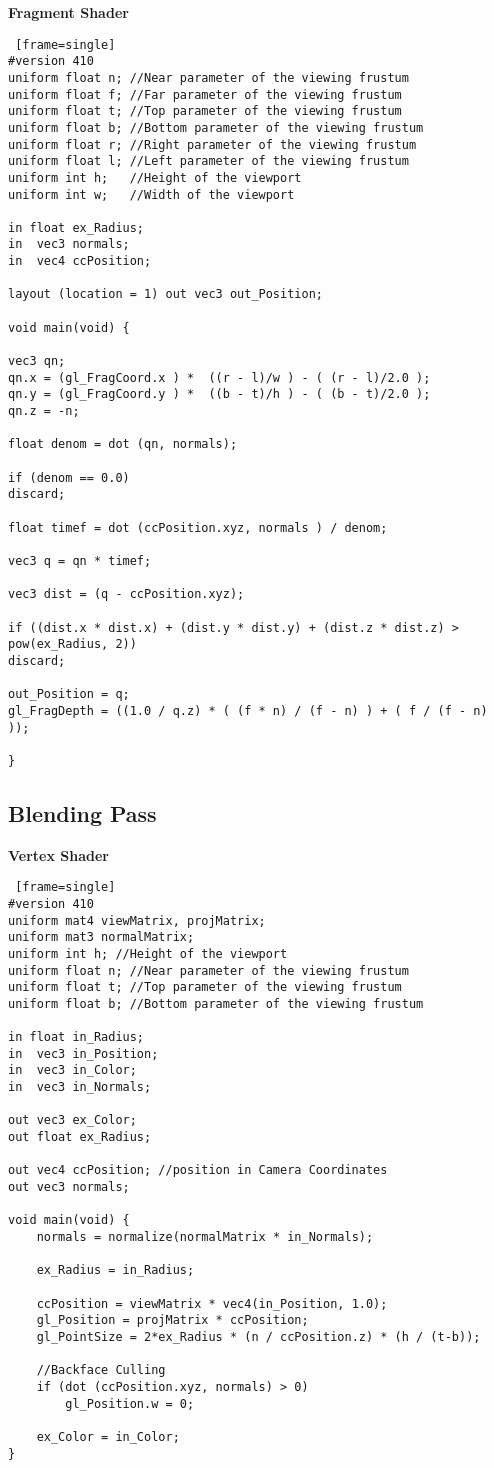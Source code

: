 \textbf{Fragment Shader}
\begin{lstlisting} [frame=single]
#version 410
uniform float n; //Near parameter of the viewing frustum
uniform float f; //Far parameter of the viewing frustum
uniform float t; //Top parameter of the viewing frustum
uniform float b; //Bottom parameter of the viewing frustum
uniform float r; //Right parameter of the viewing frustum
uniform float l; //Left parameter of the viewing frustum
uniform int h; 	 //Height of the viewport
uniform int w; 	 //Width of the viewport

in float ex_Radius;
in  vec3 normals;
in 	vec4 ccPosition;

layout (location = 1) out vec3 out_Position;

void main(void) {

vec3 qn;
qn.x = (gl_FragCoord.x ) *  ((r - l)/w ) - ( (r - l)/2.0 );
qn.y = (gl_FragCoord.y ) *  ((b - t)/h ) - ( (b - t)/2.0 );
qn.z = -n;

float denom = dot (qn, normals);

if (denom == 0.0)
discard;

float timef = dot (ccPosition.xyz, normals ) / denom;

vec3 q = qn * timef;

vec3 dist = (q - ccPosition.xyz);

if ((dist.x * dist.x) + (dist.y * dist.y) + (dist.z * dist.z) > pow(ex_Radius, 2))
discard;

out_Position = q;
gl_FragDepth = ((1.0 / q.z) * ( (f * n) / (f - n) ) + ( f / (f - n) ));

}
\end{lstlisting}
\newpage

\subsection{Blending Pass}
\textbf{Vertex Shader}
\begin{lstlisting} [frame=single]
#version 410
uniform mat4 viewMatrix, projMatrix;
uniform mat3 normalMatrix;
uniform int h; //Height of the viewport
uniform float n; //Near parameter of the viewing frustum
uniform float t; //Top parameter of the viewing frustum
uniform float b; //Bottom parameter of the viewing frustum

in float in_Radius;
in  vec3 in_Position;
in  vec3 in_Color;
in 	vec3 in_Normals;

out vec3 ex_Color;
out float ex_Radius;

out vec4 ccPosition; //position in Camera Coordinates
out vec3 normals;

void main(void) {
	normals = normalize(normalMatrix * in_Normals);

	ex_Radius = in_Radius;

	ccPosition = viewMatrix * vec4(in_Position, 1.0);
	gl_Position = projMatrix * ccPosition;
	gl_PointSize = 2*ex_Radius * (n / ccPosition.z) * (h / (t-b));

	//Backface Culling
	if (dot (ccPosition.xyz, normals) > 0)
		gl_Position.w = 0;

	ex_Color = in_Color;
}
\end{lstlisting}
\newpage

